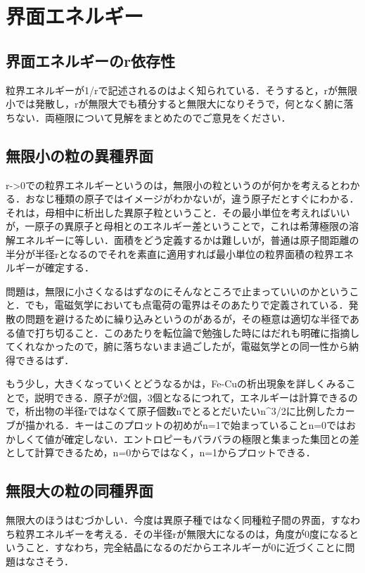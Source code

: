 \section{界面エネルギー}
\subsection{界面エネルギーのr依存性}
粒界エネルギーが1/rで記述されるのはよく知られている．そうすると，rが無限小では発散し，rが無限大でも積分すると無限大になりそうで，何となく腑に落ちない．両極限について見解をまとめたのでご意見をください．

\subsection{無限小の粒の異種界面}
r->0での粒界エネルギーというのは，無限小の粒というのが何かを考えるとわかる．おなじ種類の原子ではイメージがわかないが，違う原子だとすぐにわかる．それは，母相中に析出した異原子粒ということ．その最小単位を考えればいいが，一原子の異原子と母相とのエネルギー差ということで，これは希薄極限の溶解エネルギーに等しい．面積をどう定義するかは難しいが，普通は原子間距離の半分が半径rとなるのでそれを素直に適用すれば最小単位の粒界面積の粒界エネルギーが確定する．

問題は，無限に小さくなるはずなのにそんなところで止まっていいのかということ．でも，電磁気学においても点電荷の電界はそのあたりで定義されている．発散の問題を避けるために繰り込みというのがあるが，その極意は適切な半径である値で打ち切ること．このあたりを転位論で勉強した時にはだれも明確に指摘してくれなかったので，腑に落ちないまま過ごしたが，電磁気学との同一性から納得できるはず．

もう少し，大きくなっていくとどうなるかは，Fe-Cuの析出現象を詳しくみることで，説明できる．原子が2個，3個となるにつれて，エネルギーは計算できるので，析出物の半径rではなくて原子個数nでとるとだいたいn^3/2に比例したカーブが描かれる．キーはこのプロットの初めがn=1で始まっていることn=0ではおかしくて値が確定しない．エントロピーもバラバラの極限と集まった集団との差として計算できるため，n=0からではなく，n=1からプロットできる．

\subsection{無限大の粒の同種界面}
無限大のほうはむづかしい．今度は異原子種ではなく同種粒子間の界面，すなわち粒界エネルギーを考える．その半径rが無限大になるのは，角度が0度になるということ．すなわち，完全結晶になるのだからエネルギーが0に近づくことに問題はなさそう．

